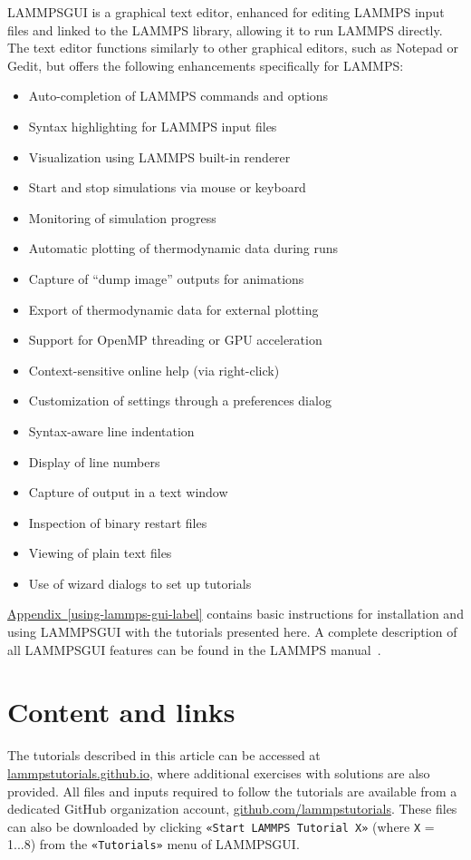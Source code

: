\documentclass[9pt,tutorial]{livecoms}
\newcommand{\guicmd}[1]{\textcolor{command}{\texttt{«#1»}}} %
\newcommand{\lammpsgui}{\textsf{LAMMPS\textendash GUI}}
\begin{document}
\lammpsgui{} is a graphical text editor, enhanced for editing LAMMPS input
files and linked to the LAMMPS library, allowing it to run LAMMPS
directly.  The text editor functions similarly to other graphical editors,
such as Notepad or Gedit, but offers the following enhancements specifically for LAMMPS:
\begin{itemize}
  \item Auto-completion of LAMMPS commands and options
  \item Syntax highlighting for LAMMPS input files
  \item Visualization using LAMMPS built-in renderer
  \item Start and stop simulations via mouse or keyboard
  \item Monitoring of simulation progress
  \item Automatic plotting of thermodynamic data during runs
  \item Capture of ``dump image'' outputs for animations
  \item Export of thermodynamic data for external plotting
  \item Support for OpenMP threading or GPU acceleration
  \item Context-sensitive online help (via right-click)
  \item Customization of settings through a preferences dialog
  \item Syntax-aware line indentation
  \item Display of line numbers
  \item Capture of output in a text window
  \item Inspection of binary restart files
  \item Viewing of plain text files
  \item Use of wizard dialogs to set up tutorials
\end{itemize}
\hyperref[using-lammps-gui-label]{Appendix~\ref{using-lammps-gui-label}}
contains basic instructions for installation and using \lammpsgui{} with
the tutorials presented here.  A complete description of all \lammpsgui{}
features can be found in the LAMMPS manual~\cite{lammps_gui_docs}.

\section{Content and links}

The tutorials described in this article can be accessed at
\href{https://lammpstutorials.github.io}{lammpstutorials.github.io},
where additional exercises with solutions are also provided.  All files
and inputs required to follow the tutorials are available from a
dedicated GitHub organization account,
\href{https://github.com/lammpstutorials}{github.com/lammpstutorials}.
These files can also be downloaded by clicking \guicmd{Start LAMMPS Tutorial X}
(where \texttt{X} = 1...8) from the \guicmd{Tutorials} menu of \lammpsgui{}.
\end{document}
